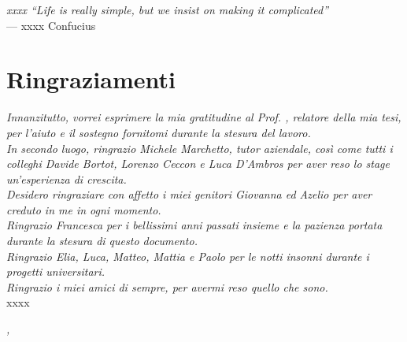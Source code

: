 
{}
{}

\begin{flushright}{
	\slshape  
	xxxx  
	``Life is really simple, but we insist on making it complicated''} \\ 
	\medskip
    --- xxxx Confucius
\end{flushright}


\bigskip

\begingroup
\let\clearpage\relax
\let\cleardoublepage\relax
\let\cleardoublepage\relax

\chapter*{Ringraziamenti}

\noindent \textit{Innanzitutto, vorrei esprimere la mia gratitudine al Prof. \myProf, relatore della mia tesi, per l'aiuto e il sostegno fornitomi durante la stesura del lavoro.}\\

\noindent \textit{In secondo luogo, ringrazio Michele Marchetto, tutor aziendale, così come tutti i colleghi Davide Bortot, Lorenzo Ceccon e Luca D'Ambros per aver reso lo stage un'esperienza di crescita.}\\

\noindent \textit{Desidero ringraziare con affetto i miei genitori Giovanna ed Azelio per aver creduto in me in ogni momento.}\\

\noindent \textit{Ringrazio Francesca per i bellissimi anni passati insieme e la pazienza portata durante la stesura di questo documento.}\\

\noindent \textit{Ringrazio Elia, Luca, Matteo, Mattia e Paolo per le notti insonni durante i progetti universitari.}\\

\noindent \textit{Ringrazio i miei amici di sempre, per avermi reso quello che sono.}\\


xxxx
\bigskip

\noindent\textit{\myLocation, \myTime}
\hfill \myName

\endgroup

